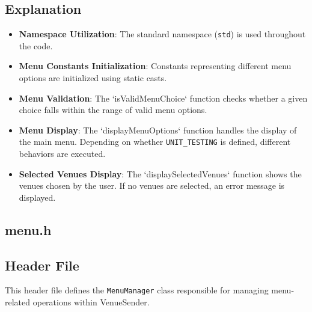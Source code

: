 \documentclass{article}
\begin{document}
	\subsection*{Explanation}
	\begin{itemize}
		\item \textbf{Namespace Utilization}: The standard namespace (\texttt{std}) is used throughout the code.
		\item \textbf{Menu Constants Initialization}: Constants representing different menu options are initialized using static casts.
		\item \textbf{Menu Validation}: The `isValidMenuChoice` function checks whether a given choice falls within the range of valid menu options.
		\item \textbf{Menu Display}: The `displayMenuOptions` function handles the display of the main menu. Depending on whether \texttt{UNIT\_TESTING} is defined, different behaviors are executed.
		\item \textbf{Selected Venues Display}: The `displaySelectedVenues` function shows the venues chosen by the user. If no venues are selected, an error message is displayed.
	\end{itemize}
	
	\subsection{menu.h}
	
	\subsection*{Header File}
	This header file defines the \texttt{MenuManager} class responsible for managing menu-related operations within VenueSender.
	
\end{document}
